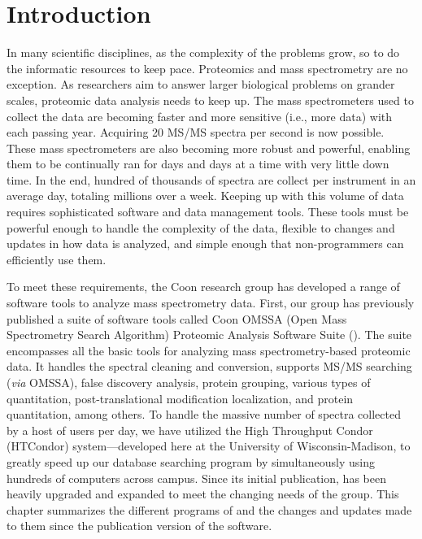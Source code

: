 \section{Introduction}
In many scientific disciplines, as the complexity of the problems grow, so to do the informatic resources to keep pace. Proteomics and mass spectrometry are no exception. As researchers aim to answer larger biological problems on grander scales, proteomic data analysis needs to keep up. The mass spectrometers used to collect the data are becoming faster and more sensitive (i.e., more data) with each passing year. Acquiring 20 MS/MS spectra per second is now possible. These mass spectrometers are also becoming more robust and powerful, enabling them to be continually ran for days and days at a time with very little down time. In the end, hundred of thousands of spectra are collect per instrument in an average day, totaling millions over a week. Keeping up with this volume of data requires sophisticated software and data management tools. These tools must be powerful enough to handle the complexity of the data, flexible to changes and updates in how data is analyzed, and simple enough that non-programmers can efficiently use them. 

To meet these requirements, the Coon research group has developed a range of software tools to analyze mass spectrometry data. First, our group has previously published a suite of software tools called Coon OMSSA (Open Mass Spectrometry Search Algorithm)\cite{omssa} Proteomic Analysis Software Suite (\compass{}).\cite{compass} The suite encompasses all the basic tools for analyzing mass spectrometry-based proteomic data. It handles the spectral cleaning and conversion, supports MS/MS searching (\emph{via} OMSSA), false discovery analysis, protein grouping, various types of quantitation, post-translational modification localization, and protein quantitation, among others. To handle the massive number of spectra collected by a host of users per day, we have utilized the High Throughput Condor (HTCondor) system---developed here at the University of Wisconsin-Madison, to greatly speed up our database searching program by simultaneously using hundreds of computers across campus. Since its initial publication, \compass{} has been heavily upgraded and expanded to meet the changing needs of the group. This chapter summarizes the different programs of \compass{} and the changes and updates made to them since the publication version of the software.

